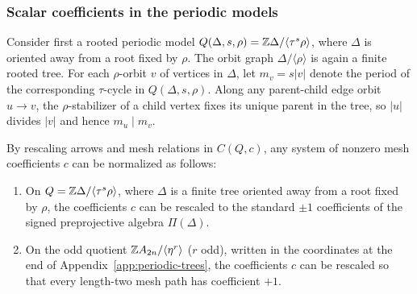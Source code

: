 \subsubsection{Scalar coefficients in the periodic models}

Consider first a rooted periodic model $Q(\Delta,s,\rho)=\mathbb Z\Delta/\langle\tau^s\rho\rangle$, where $\Delta$ is oriented away from a root fixed by $\rho$. The orbit graph $\Delta/\langle\rho\rangle$ is again a finite rooted tree. For each $\rho$-orbit $v$ of vertices in $\Delta$, let $m_v=s|v|$ denote the period of the corresponding $\tau$-cycle in $Q(\Delta,s,\rho)$. Along any parent-child edge orbit $u\to v$, the $\rho$-stabilizer of a child vertex fixes its unique parent in the tree, so $|u|$ divides $|v|$ and hence $m_u\mid m_v$.

\begin{lemma}
\label{lem:periodic-scalar-gauges}
By rescaling arrows and mesh relations in $C(Q,c)$, any system of nonzero mesh coefficients $c$ can be normalized as follows:
\begin{enumerate}[label={\upshape(\arabic*)}]
\item On $Q=\mathbb Z\Delta/\langle\tau^s\rho\rangle$, where $\Delta$ is a finite tree oriented away from a root fixed by $\rho$, the coefficients $c$ can be rescaled to the standard $\pm1$ coefficients of the signed preprojective algebra $\Pi(\Delta)$.
\item On the odd quotient $\mathbb Z A_{2n}/\langle\eta^r\rangle$ ($r$ odd), written in the coordinates at the end of Appendix~\ref{app:periodic-trees}, the coefficients $c$ can be rescaled so that every length-two mesh path has coefficient $+1$.
\end{enumerate}
\end{lemma}
